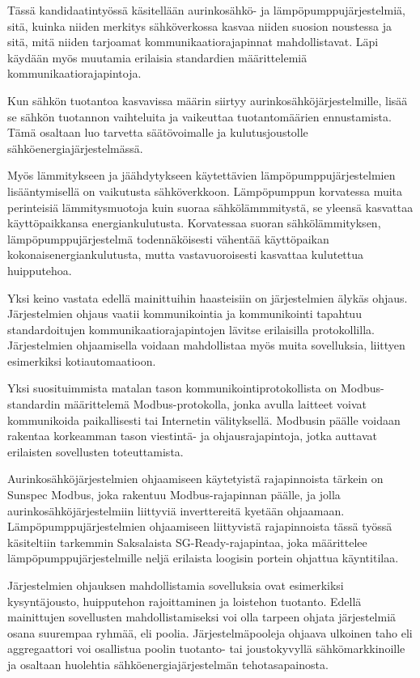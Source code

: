 Tässä kandidaatintyössä käsitellään aurinkosähkö- ja lämpöpumppujärjestelmiä, sitä, kuinka niiden merkitys sähköverkossa kasvaa niiden suosion noustessa ja sitä, mitä niiden tarjoamat kommunikaatiorajapinnat mahdollistavat. Läpi käydään myös muutamia erilaisia standardien määrittelemiä kommunikaatiorajapintoja.

Kun sähkön tuotantoa kasvavissa määrin siirtyy aurinkosähköjärjestelmille, lisää se sähkön tuotannon vaihteluita ja vaikeuttaa tuotantomäärien ennustamista. Tämä osaltaan luo tarvetta säätövoimalle ja kulutusjoustolle sähköenergiajärjestelmässä.

Myös lämmitykseen ja jäähdytykseen käytettävien lämpöpumppujärjestelmien lisääntymisellä on vaikutusta sähköverkkoon. Lämpöpumppun korvatessa muita perinteisiä lämmitysmuotoja kuin suoraa sähkölämmmitystä, se yleensä kasvattaa käyttöpaikkansa energiankulutusta. Korvatessaa suoran sähkölämmityksen, lämpöpumppujärjestelmä todennäköisesti vähentää käyttöpaikan kokonaisenergiankulutusta, mutta vastavuoroisesti kasvattaa kulutettua huipputehoa.

Yksi keino vastata edellä mainittuihin haasteisiin on järjestelmien älykäs ohjaus. Järjestelmien ohjaus vaatii kommunikointia ja kommunikointi tapahtuu standardoitujen kommunikaatiorajapintojen lävitse erilaisilla protokollilla. Järjestelmien ohjaamisella voidaan mahdollistaa myös muita sovelluksia, liittyen esimerkiksi kotiautomaatioon.

Yksi suosituimmista matalan tason kommunikointiprotokollista on Modbus-standardin määrittelemä Modbus-protokolla, jonka avulla laitteet voivat kommunikoida paikallisesti tai Internetin välityksellä. Modbusin päälle voidaan rakentaa korkeamman tason viestintä- ja ohjausrajapintoja, jotka auttavat erilaisten sovellusten toteuttamista.

Aurinkosähköjärjestelmien ohjaamiseen käytetyistä rajapinnoista tärkein on Sunspec Modbus, joka rakentuu Modbus-rajapinnan päälle, ja jolla aurinkosähköjärjestelmiin liittyviä inverttereitä kyetään ohjaamaan. Lämpöpumppujärjestelmien ohjaamiseen liittyvistä rajapinnoista tässä työssä käsiteltiin tarkemmin Saksalaista SG-Ready-rajapintaa, joka määrittelee lämpöpumppujärjestelmille neljä erilaista loogisin portein ohjattua käyntitilaa.

Järjestelmien ohjauksen mahdollistamia sovelluksia ovat esimerkiksi kysyntäjousto, huipputehon rajoittaminen ja loistehon tuotanto. Edellä mainittujen sovellusten mahdollistamiseksi voi olla tarpeen ohjata järjestelmiä osana suurempaa ryhmää, eli poolia. Järjestelmäpooleja ohjaava ulkoinen taho eli aggregaattori voi osallistua poolin tuotanto- tai joustokyvyllä sähkömarkkinoille ja osaltaan huolehtia sähköenergiajärjestelmän tehotasapainosta.
